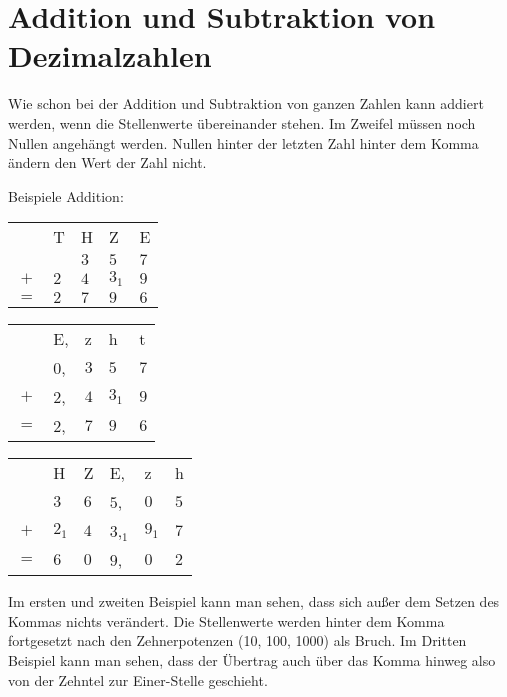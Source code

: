 \section{Addition und Subtraktion von Dezimalzahlen}\vspace{-1em}
Wie schon bei der Addition und Subtraktion von ganzen Zahlen kann addiert werden, wenn die Stellenwerte übereinander stehen. Im Zweifel müssen noch Nullen angehängt werden. Nullen hinter der letzten Zahl hinter dem Komma ändern den Wert der Zahl nicht.

Beispiele Addition:\\
\begin{tabular}{cllll}
	& T   & H   & Z     & E   \\
	&     & $3$ & $5$   & $7$ \\
	$+$ & $2$ & $4$ & $3_1$ & $9$ \\ \hline
	$=$ & $2$ & $7$ & $9$   & $6$
\end{tabular}
%
\hfill
%
\begin{tabular}{cllll}
	& E,   & z   & h     & t   \\
	&    $0$, & $3$ & $5$   & $7$ \\
	$+$ & $2$, & $4$ & $3_1$ & $9$ \\ \hline
	$=$ & $2$, & $7$ & $9$   & $6$
\end{tabular}
%
\hfill
%
\begin{tabular}{clllll}
	& H   & Z   &  E,    & z & h   \\
	& $3$ & $6$ & $5$, & $0$ & $5$ \\
	$+$ & $2_1$ & $4$ & $3$,$_1$ & $9_1$ & $7$ \\ \hline
	$=$ & $6$ & $0$ & $9$,   & $0$ & $2$
\end{tabular}
%

Im ersten und zweiten Beispiel kann man sehen, dass sich außer dem Setzen des Kommas nichts verändert. Die Stellenwerte werden hinter dem Komma fortgesetzt nach den Zehnerpotenzen (10, 100, 1000) als Bruch. Im Dritten Beispiel kann man sehen, dass der Übertrag auch über das Komma hinweg also von der Zehntel zur Einer-Stelle geschieht.

